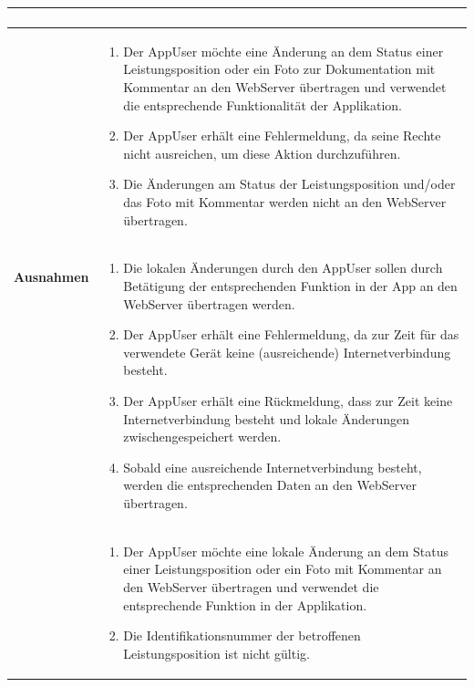 \begin{longtable}[c]{|p{4cm}|p{10cm}|}
\begin{enumerate}
    \end{enumerate}                                                                                                                                                                                                                                                                                                                                      \\ \hline
    \multirow{2}{*}{\textbf{Ausnahmen}} &
    \begin{enumerate}
        \item Der AppUser m\"ochte eine \"Anderung an dem Status einer Leistungsposition oder ein Foto zur Dokumentation mit Kommentar an den WebServer \"ubertragen und verwendet die entsprechende Funktionalit\"at der Applikation.
        \item Der AppUser erh\"alt eine Fehlermeldung, da seine Rechte nicht ausreichen, um diese Aktion durchzuf\"uhren.
        \item Die \"Anderungen am Status der Leistungsposition und/oder das Foto mit Kommentar werden nicht an den WebServer \"ubertragen.
    \end{enumerate}
    \\\cline{2-2}                 &
    \begin{enumerate}
        \item Die lokalen \"Anderungen durch den AppUser sollen durch Bet\"atigung der entsprechenden Funktion in der App an den WebServer \"ubertragen werden.
        \item Der AppUser erh\"alt eine Fehlermeldung, da zur Zeit f\"ur das verwendete Ger\"at keine (ausreichende) Internetverbindung besteht.
        \item Der AppUser erh\"alt eine R\"uckmeldung, dass zur Zeit keine Internetverbindung besteht und lokale \"Anderungen zwischengespeichert werden.
        \item Sobald eine ausreichende Internetverbindung besteht, werden die entsprechenden Daten an den WebServer \"ubertragen.
    \end{enumerate}
    \\\cline{2-2}                 &
    \begin{enumerate}
        \item Der AppUser m\"ochte eine lokale \"Anderung an dem Status einer Leistungsposition oder ein Foto mit Kommentar an den WebServer \"ubertragen und verwendet die entsprechende Funktion in der Applikation.
        \item Die Identifikationsnummer der betroffenen Leistungsposition ist nicht g\"ultig.

\end{enumerate}
\end{longtable}
